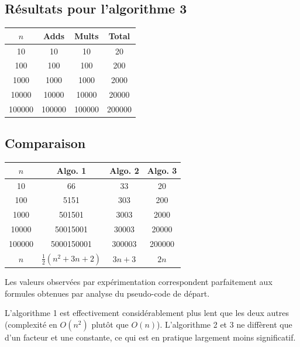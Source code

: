\documentclass[11pt,a4paper]{article}
\begin{document}
\subsection{Résultats pour l'algorithme 3}

\begin{center}
\begin{tabular}{ c | c | c | c }
	$n$ & Adds & Mults & Total \\
	\hline                       
	10 & 10 & 10 & 20 \\
	100 & 100 & 100 & 200 \\
	1000 & 1000 & 1000 & 2000 \\
	10000 & 10000 & 10000 & 20000 \\
	100000 & 100000 & 100000 & 200000 \\
\end{tabular}
\end{center}


\subsection{Comparaison}

\begin{center}
\begin{tabular}{ c | c | c | c }
	$n$ & Algo. 1 & Algo. 2 & Algo. 3 \\
	\hline                       
	10 & 66 & 33 & 20 \\
	100 & 5151 & 303 & 200 \\
	1000 & 501501 & 3003 & 2000 \\
	10000 & 50015001 & 30003 & 20000 \\
	100000 & 5000150001 & 300003 & 200000 \\
	\hline  
	$n$ & $\frac{1}{2}(n^{2}+3n+2)$ & $3n+3$ & $2n$ \\                     
\end{tabular}
\end{center}

\vspace{1em}

Les valeurs observées par expérimentation correspondent parfaitement aux formules obtenues par analyse du pseudo-code de départ.

L'algorithme 1 est effectivement considérablement plus lent que les deux autres (complexité en $O(n^{2})$ plutôt que $O(n)$). L'algorithme 2 et 3 ne diffèrent que d'un facteur et une constante, ce qui est en pratique largement moins significatif.
\end{document}
